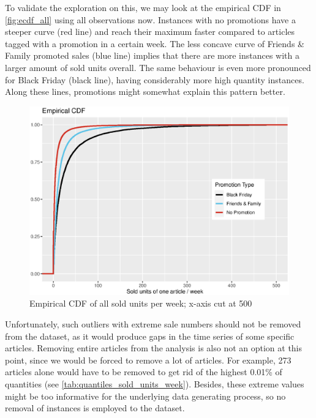 To validate the exploration on this, we may look at the empirical \ac{CDF} in \autoref{fig:ecdf_all} using all observations now.
Instances with no promotions have a steeper curve (red line) and reach their maximum faster compared to articles tagged with a promotion in a certain week. The less concave curve of Friends \& Family promoted sales (blue line) implies that there are more instances with a larger amount of sold units overall. The same behaviour is even more pronounced for Black Friday (black line), having considerably more high quantity instances. Along these lines, promotions might somewhat explain this pattern better.\\
 
 
 \begin{figure}[H]
\centering
  \includegraphics[width=0.65\linewidth]{figures/ecdf_all.eps}
  \caption{Empirical \ac{CDF} of all sold units per week; x-axis cut at 500}
  \label{fig:ecdf_all}
\end{figure}



Unfortunately, such outliers with extreme sale numbers should not be removed from the dataset, as it would produce gaps in the time series of some specific articles. Removing entire articles from the analysis is also not an option at this point, since we would be forced to remove a lot of articles.
For example, 273 articles alone would have to be removed to get rid of the highest 0.01\% of quantities (see \autoref{tab:quantiles_sold_units_week}). Besides, these extreme values might be too informative for the underlying data generating process, so no removal of instances is employed to the dataset.








